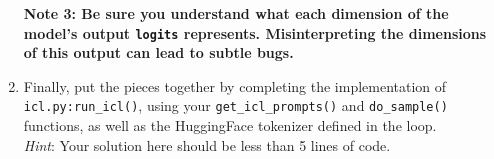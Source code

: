\begin{enumerate}[label=(\roman*)]
    \textbf{Note 3: Be sure you understand what each dimension of the model's output \texttt{logits} represents. Misinterpreting the dimensions of this output can lead to subtle bugs.}
    
    \item Finally, put the pieces together by completing the implementation of \texttt{icl.py:\allowbreak run\_icl()}, using your \texttt{get\_icl\_prompts()} and \texttt{do\_sample()} functions, as well as the HuggingFace tokenizer defined in the loop. \\ \emph{Hint}: Your solution here should be less than 5 lines of code.
\end{enumerate}